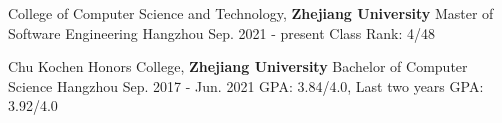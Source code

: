 \begin{cventries}

	\cventry
	{College of Computer Science and Technology, \textbf{Zhejiang University}} %
	{Master of Software Engineering} %
	{Hangzhou} %
	{Sep. 2021 - present} %
	{
		Class Rank: 4/48
	}%
	\vspace{1mm}

	\cventry
	{Chu Kochen Honors College, \textbf{Zhejiang University}} %
	{Bachelor of Computer Science} %
	{Hangzhou} %
	{Sep. 2017 - Jun. 2021} %
	{
		GPA: 3.84/4.0, Last two years GPA: 3.92/4.0
	}%
	\vspace{1mm}
 
\end{cventries}
